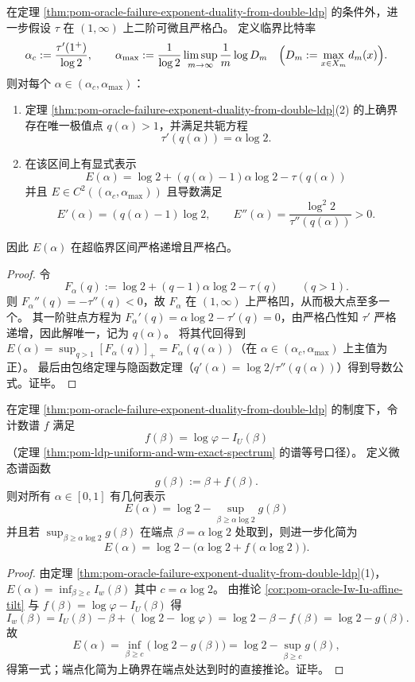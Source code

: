\begin{theorem}\label{thm:pom-oracle-failure-thermo-conjugacy-smooth}
在定理 \ref{thm:pom-oracle-failure-exponent-duality-from-double-ldp} 的条件外，进一步假设 \(\tau\) 在 \((1,\infty)\) 上二阶可微且严格凸。
定义临界比特率
\[
\alpha_c:=\frac{\tau'(1^+)}{\log 2},
\qquad
\alpha_{\max}:=\frac{1}{\log 2}\limsup_{m\to\infty}\frac1m\log D_m
\quad\Bigl(D_m:=\max_{x\in X_m}d_m(x)\Bigr).
\]
则对每个 \(\alpha\in(\alpha_c,\alpha_{\max})\)：
\begin{enumerate}
  \item 定理 \ref{thm:pom-oracle-failure-exponent-duality-from-double-ldp}(2) 的上确界存在唯一极值点 \(q(\alpha)>1\)，并满足共轭方程
  \[
  \boxed{\;\tau'(q(\alpha))=\alpha\log 2.\;}
  \]
  \item 在该区间上有显式表示
  \[
  \boxed{\;
  E(\alpha)=\log 2+(q(\alpha)-1)\alpha\log 2-\tau(q(\alpha))\;}
  \]
  并且 \(E\in C^2((\alpha_c,\alpha_{\max}))\) 且导数满足
  \[
  E'(\alpha)=(q(\alpha)-1)\log 2,
  \qquad
  E''(\alpha)=\frac{\log^2 2}{\tau''(q(\alpha))}>0.
  \]
\end{enumerate}
因此 \(E(\alpha)\) 在超临界区间严格递增且严格凸。
\end{theorem}
\begin{proof}
令
\[
F_\alpha(q):=\log 2+(q-1)\alpha\log 2-\tau(q)\qquad(q>1).
\]
则 \(F_\alpha''(q)=-\tau''(q)<0\)，故 \(F_\alpha\) 在 \((1,\infty)\) 上严格凹，从而极大点至多一个。
其一阶驻点方程为 \(F_\alpha'(q)=\alpha\log 2-\tau'(q)=0\)，由严格凸性知 \(\tau'\) 严格递增，因此解唯一，记为 \(q(\alpha)\)。
将其代回得到 \(E(\alpha)=\sup_{q>1}[F_\alpha(q)]_+=F_\alpha(q(\alpha))\)（在 \(\alpha\in(\alpha_c,\alpha_{\max})\) 上主值为正）。
最后由包络定理与隐函数定理（\(q'(\alpha)=\log 2/\tau''(q(\alpha))\)）得到导数公式。证毕。
\end{proof}

\begin{theorem}\label{thm:pom-oracle-failure-multifractal-geometry}
在定理 \ref{thm:pom-oracle-failure-exponent-duality-from-double-ldp} 的制度下，令计数谱 \(f\) 满足
\[
f(\beta)=\log\varphi-I_U(\beta)
\]
（定理 \ref{thm:pom-ldp-uniform-and-wm-exact-spectrum} 的谱等号口径）。
定义微态谱函数
\[
g(\beta):=\beta+f(\beta).
\]
则对所有 \(\alpha\in[0,1]\) 有几何表示
\[
\boxed{\;
E(\alpha)=\log 2-\sup_{\beta\ge \alpha\log 2} g(\beta)\;}
\]
并且若 \(\sup_{\beta\ge \alpha\log 2}g(\beta)\) 在端点 \(\beta=\alpha\log 2\) 处取到，则进一步化简为
\[
E(\alpha)=\log 2-\bigl(\alpha\log 2+f(\alpha\log 2)\bigr).
\]
\end{theorem}
\begin{proof}
由定理 \ref{thm:pom-oracle-failure-exponent-duality-from-double-ldp}(1)，
\(
E(\alpha)=\inf_{\beta\ge c}I_w(\beta)
\)
其中 \(c=\alpha\log 2\)。
由推论 \ref{cor:pom-oracle-Iw-Iu-affine-tilt} 与 \(f(\beta)=\log\varphi-I_U(\beta)\) 得
\[
I_w(\beta)=I_U(\beta)-\beta+(\log 2-\log\varphi)=\log 2-\beta-f(\beta)=\log 2-g(\beta).
\]
故
\[
E(\alpha)=\inf_{\beta\ge c}\bigl(\log 2-g(\beta)\bigr)=\log 2-\sup_{\beta\ge c}g(\beta),
\]
得第一式；端点化简为上确界在端点处达到时的直接推论。证毕。
\end{proof}

